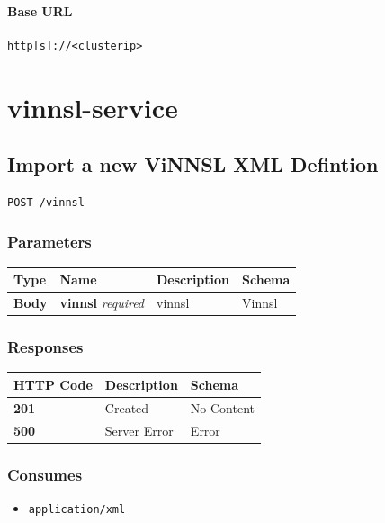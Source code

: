 \paragraph{Base URL}\label{base-url}

\begin{verbatim}
http[s]://<clusterip>
\end{verbatim}

\section{vinnsl-service}\label{vinnsl-service-2}

\subsection{Import a new ViNNSL XML
Defintion}\label{import-a-new-vinnsl-xml-defintion}

\begin{verbatim}
POST /vinnsl
\end{verbatim}

\subsubsection{Parameters}\label{parameters-1}

\begin{longtable}[]{@{}llll@{}}
\toprule
Type & Name & Description & Schema\tabularnewline
\midrule
\endhead
\textbf{Body} & \textbf{vinnsl} \emph{required} & vinnsl &
Vinnsl\tabularnewline
\bottomrule
\end{longtable}

\subsubsection{Responses}\label{responses}

\begin{longtable}[]{@{}lll@{}}
\toprule
HTTP Code & Description & Schema\tabularnewline
\midrule
\endhead
\textbf{201} & Created & No Content\tabularnewline
\textbf{500} & Server Error & Error\tabularnewline
\bottomrule
\end{longtable}

\subsubsection{Consumes}\label{consumes}

\begin{itemize}
\tightlist
\item
  \texttt{application/xml}
\end{itemize}

